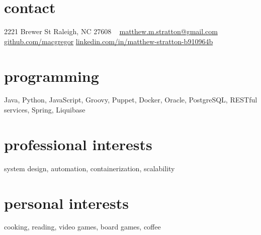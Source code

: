 
\begin{aside} %
\section{contact}
2221 Brewer St
Raleigh, NC 27608
~
\href{mailto:matthew.m.stratton@gmail.com}{\scriptsize{matthew.m.stratton@gmail.com}}
\href{https://github.com/macgregor}{github.com/macgregor}
\href{https://www.linkedin.com/in/matthew-stratton-b910964b}{\scriptsize{linkedin.com/in/matthew-stratton-b910964b}}
\section{programming}
Java, Python, JavaScript, Groovy, Puppet, Docker, Oracle, PostgreSQL, RESTful services, Spring, Liquibase
\section{professional interests}
system design, automation, containerization, scalability
~
\section{personal interests}
 cooking, reading, video games, board games, coffee
\end{aside}
